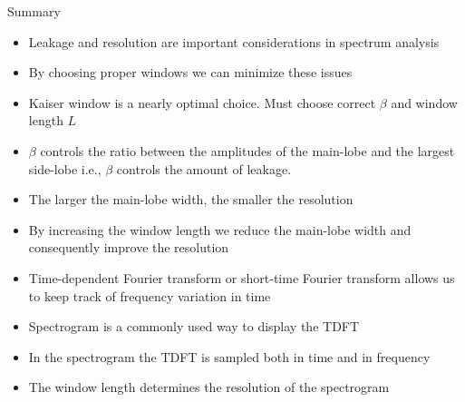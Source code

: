 \documentclass[10pt]{beamer}
\begin{document}
\begin{frame}{Summary}
	\begin{itemize}
		\item Leakage and resolution are important considerations in spectrum analysis
		\item By choosing proper windows we can minimize these issues
		\item Kaiser window is a nearly optimal choice. Must choose correct $\beta$ and window length $L$
		\item $\beta$ controls the ratio between the amplitudes of the main-lobe and the largest side-lobe i.e., $\beta$ controls the amount of leakage.
		\item The larger the main-lobe width, the smaller the resolution
		\item By increasing the window length we reduce the main-lobe width and consequently improve the resolution
		\item Time-dependent Fourier transform or short-time Fourier transform allows us to keep track of frequency variation in time
		\item Spectrogram is a commonly used way to display the TDFT
		\item In the spectrogram the TDFT is sampled both in time and in frequency
		\item The window length determines the resolution of the spectrogram
	\end{itemize}
\end{frame}
\end{document}

